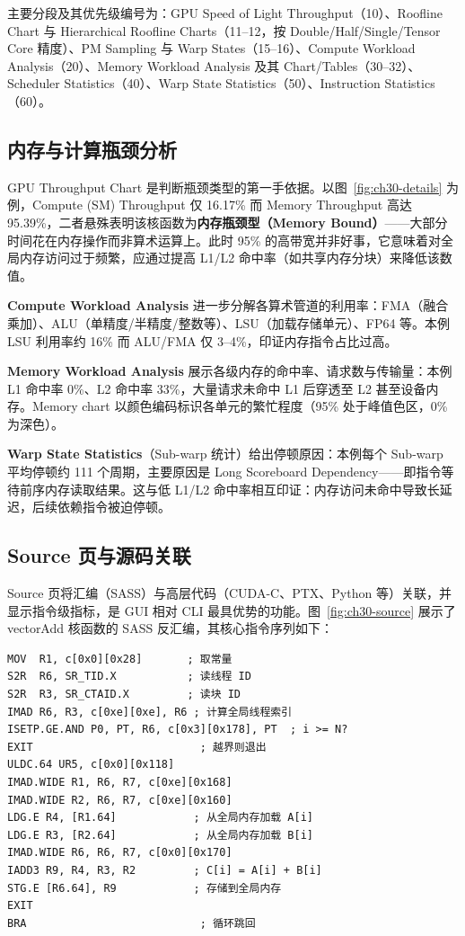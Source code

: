 主要分段及其优先级编号为：GPU Speed of Light Throughput（10）、Roofline Chart 与 Hierarchical Roofline Charts（11--12，按 Double/Half/Single/Tensor Core 精度）、PM Sampling 与 Warp States（15--16）、Compute Workload Analysis（20）、Memory Workload Analysis 及其 Chart/Tables（30--32）、Scheduler Statistics（40）、Warp State Statistics（50）、Instruction Statistics（60）。

\subsection{内存与计算瓶颈分析}

GPU Throughput Chart 是判断瓶颈类型的第一手依据。以图~\ref{fig:ch30-details} 为例，Compute (SM) Throughput 仅 16.17\% 而 Memory Throughput 高达 95.39\%，二者悬殊表明该核函数为\textbf{内存瓶颈型（Memory Bound）}——大部分时间花在内存操作而非算术运算上。此时 95\% 的高带宽并非好事，它意味着对全局内存访问过于频繁，应通过提高 L1/L2 命中率（如共享内存分块）来降低该数值。

\textbf{Compute Workload Analysis} 进一步分解各算术管道的利用率：FMA（融合乘加）、ALU（单精度/半精度/整数等）、LSU（加载存储单元）、FP64 等。本例 LSU 利用率约 16\% 而 ALU/FMA 仅 3--4\%，印证内存指令占比过高。

\textbf{Memory Workload Analysis} 展示各级内存的命中率、请求数与传输量：本例 L1 命中率 0\%、L2 命中率 33\%，大量请求未命中 L1 后穿透至 L2 甚至设备内存。Memory chart 以颜色编码标识各单元的繁忙程度（95\% 处于峰值色区，0\% 为深色）。

\textbf{Warp State Statistics}（Sub-warp 统计）给出停顿原因：本例每个 Sub-warp 平均停顿约 111 个周期，主要原因是 Long Scoreboard Dependency——即指令等待前序内存读取结果。这与低 L1/L2 命中率相互印证：内存访问未命中导致长延迟，后续依赖指令被迫停顿。

\subsection{Source 页与源码关联}

Source 页将汇编（SASS）与高层代码（CUDA-C、PTX、Python 等）关联，并显示指令级指标，是 GUI 相对 CLI 最具优势的功能。图~\ref{fig:ch30-source} 展示了 vectorAdd 核函数的 SASS 反汇编，其核心指令序列如下：

\begin{lstlisting}
MOV  R1, c[0x0][0x28]       ; 取常量
S2R  R6, SR_TID.X           ; 读线程 ID
S2R  R3, SR_CTAID.X         ; 读块 ID
IMAD R6, R3, c[0xe][0xe], R6 ; 计算全局线程索引
ISETP.GE.AND P0, PT, R6, c[0x3][0x178], PT  ; i >= N?
EXIT                          ; 越界则退出
ULDC.64 UR5, c[0x0][0x118]
IMAD.WIDE R1, R6, R7, c[0xe][0x168]
IMAD.WIDE R2, R6, R7, c[0xe][0x160]
LDG.E R4, [R1.64]            ; 从全局内存加载 A[i]
LDG.E R3, [R2.64]            ; 从全局内存加载 B[i]
IMAD.WIDE R6, R6, R7, c[0x0][0x170]
IADD3 R9, R4, R3, R2         ; C[i] = A[i] + B[i]
STG.E [R6.64], R9            ; 存储到全局内存
EXIT
BRA                           ; 循环跳回
\end{lstlisting}

